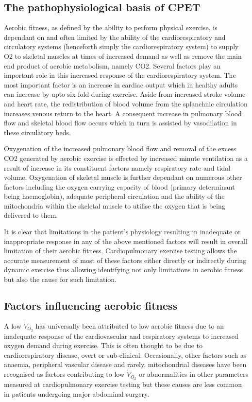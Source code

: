\subsection{The pathophysiological basis of CPET}
Aerobic fitness, as defined by the ability to perform physical exercise, is dependant on and often limited by the ability of the cardiorespiratory and circulatory systems (henceforth simply the cardiorespiratory system) to supply O2 to skeletal muscles at times of increased demand as well as remove the main end product of aerobic metabolism, namely CO2. 
Several factors play an important role in this increased response of the cardiorespiratory system. 
The most important factor is an increase in cardiac output which in healthy adults can increase by upto six-fold during exercise. 
Aside from increased stroke volume and heart rate, the redistribution of blood volume from the splanchnic circulation increases venous return to the heart. 
A consequent increase in pulmonary blood flow and skeletal blood flow occurs which in turn is assisted by vasodilation in these circulatory beds.

Oxygenation of the increased pulmonary blood flow and removal of the excess CO2 generated by aerobic exercise is effected by increased minute ventilation as a result of increase in its constituent factors namely respiratory rate and tidal volume. 
Oxygenation of skeletal muscle is further dependant on numerous other factors including the oxygen carrying capacity of blood (primary determinant being haemoglobin), adequate peripheral circulation and the ability of the mitochondria within the skeletal muscle to utilise the oxygen that is being delivered to them. 

It is clear that limitations in the patient's physiology resulting in inadequate or inappropriate response in any of the above mentioned factors will result in overall limitation of their aerobic fitness. 
Cardiopulmonary exercise testing allows the accurate measurement of most of these factors either directly or indirectly during dynamic exercise thus allowing identifying not only limitations in aerobic fitness but also the cause for such limitation. 

\subsection{Factors influencing aerobic fitness}
A low $\dot{V}_{O_2}$ has universally been attributed to low aerobic fitness due to an inadequate response of the cardiovascular and respiratory systems to increased oxygen demand during exercise. 
This is often thought to be due to cardiorespiratory disease, overt or sub-clinical. 
Occasionally, other factors such as anaemia, peripheral vascular disease and rarely, mitochondrial diseases have been recognised as factors contributing to low $\dot{V}_{O_2}$ or abnormalities in other parameters measured at cardiopulmonary exercise testing but these causes are less common in patients undergoing major abdominal surgery.

